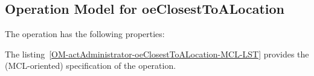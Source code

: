 \subsection{Operation Model for oeClosestToALocation}

\label{OM-oeClosestToALocation}


The  operation has the following properties:

	\begin{operationmodel}



		


	\end{operationmodel}



	\vspace{1cm}
	The listing~\ref{OM-actAdministrator-oeClosestToALocation-MCL-LST} provides the \msrmessir (MCL-oriented) specification of the operation.
	
